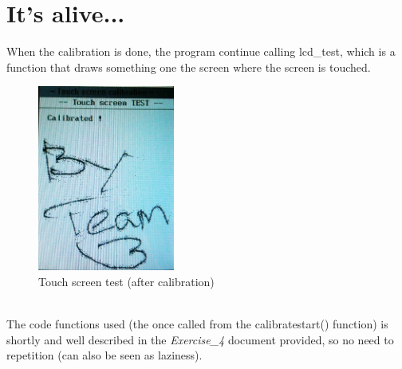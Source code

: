 \section{It's alive...}
When the calibration is done, the program continue calling lcd\_test, which is a function that draws something one the screen where the screen is touched.
\begin{figure}[h!]
   \centering
   \includegraphics[width=0.4\textwidth]{lcd_test.jpg}
   \caption{Touch screen test (after calibration)}
   \label{fig:example}
\end{figure}
\textbf{ }\\ \newline
The code functions used (the once called from the calibratestart() function) is shortly and well described in the \textit{Exercise\_4} document provided, so no need to repetition (can also be seen as laziness).

